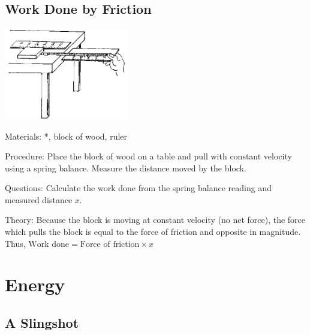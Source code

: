 \begin{multicols}{2}
\subsection{Work Done by Friction}

\begin{center}
\includegraphics[width=0.4\textwidth]{./img/source/work-friction.png}
\end{center}

\begin{description*}
\item[Materials:]{*, block of wood, ruler}
\item[Procedure:]{Place the block of wood on a table and pull with constant velocity using a spring balance. Measure the distance moved by the block.}
\item[Questions:]{Calculate the work done from the spring balance reading and measured distance $x$.}
\item[Theory:]{Because the block is moving at constant velocity (no net force), the force which pulls the block is equal to the force of friction and opposite in magnitude. Thus, $\text{Work done} = \text{Force of friction} \times x$}
\end{description*}


\section*{Energy}


\subsection{A Slingshot}


\end{multicols}

